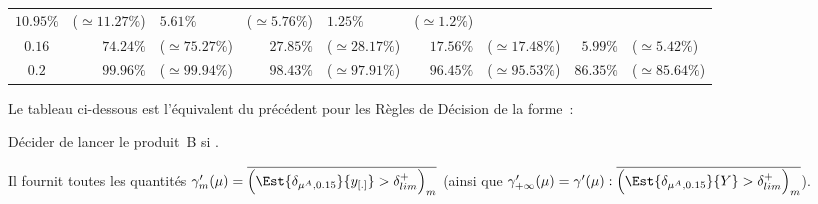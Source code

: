 \documentclass[10pt]{report}
\begin{document}
\begin{exercice}
\begin{center}
\begin{tabular}{|c|rl|rl|rl|rl|}
        $10.95\%$
         & 
    
        ($\simeq11.27\%$)
         & 
    
        $5.61\%$
         & 
    
        ($\simeq5.76\%$)
         & 
    
        $1.25\%$
         & 
    
        ($\simeq1.2\%$)
        
    \\ 

    
        $0.16$
         & 
    
        $74.24\%$
         & 
    
        ($\simeq75.27\%$)
         & 
    
        $27.85\%$
         & 
    
        ($\simeq28.17\%$)
         & 
    
        $17.56\%$
         & 
    
        ($\simeq17.48\%$)
         & 
    
        $5.99\%$
         & 
    
        ($\simeq5.42\%$)
        
    \\ 

    
        $0.2$
         & 
    
        $99.96\%$
         & 
    
        ($\simeq99.94\%$)
         & 
    
        $98.43\%$
         & 
    
        ($\simeq97.91\%$)
         & 
    
        $96.45\%$
         & 
    
        ($\simeq95.53\%$)
         & 
    
        $86.35\%$
         & 
    
        ($\simeq85.64\%$)
        
    \\ \cline{1-9}

    \end{tabular}

\end{center}

\noindent Le tableau ci-dessous est l'équivalent du précédent pour les Règles de Décision de la forme~:
\begin{center}
Décider de lancer le produit~B si .
\end{center} 
Il fournit toutes les quantités $\gamma^\prime_m(\mu)=\overline{\Big(\Est{\delta_{\mu^A,0.15}}{y_{[.]}}>\delta^+_{lim}\Big)_m}$ (ainsi que $\gamma^\prime_{+\infty}(\mu)=\gamma^\prime(\mu):\overline{\Big(\Est{\delta_{\mu^A,0.15}}{Y}>\delta^+_{lim}\Big)_m}$).


\end{exercice}
\end{document}
